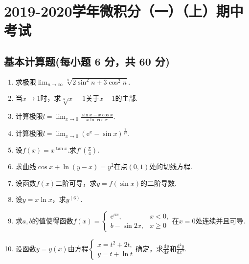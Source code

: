 \documentclass[../main.tex]{subfiles}
\begin{document}
\chapter{2019-2020学年微积分（一）（上）期中考试}

\section{基本计算题(每小题 6 分，共 60 分)}
\begin{enumerate}
    \item 求极限$\lim_{n\to \infty}\sqrt[n]{2\sin^{2} n+3\cos^{2} n}$.
          \vspace{10em}

    \item 当$x\to1$时，求$\sqrt[3]{x}-1$关于$x-1$的主部.
          \vspace{12em}

    \item 计算极限$l=\lim_{x\to0}\frac{\sin x-x\cos x}{x\ln\cos x}$.
          \vspace{12em}

    \item 计算极限$l=\lim_{x\to0}\left(\mathrm{e}^{x}-\sin x\right)^{\frac{1}{x^{2}}}$.
          \vspace{11em}

    \item 设$f(x)=x^{\tan x}$.求$f'\left(\frac{\pi}{4}\right)$.
          \vspace{9em}

    \item 求曲线$\cos x+\ln(y-x)=y^{2}$在点$(0,1)$处的切线方程.
          \vspace{10em}

    \item 设函数$f(x)$二阶可导，求$y=f(\sin x)$的二阶导数.
          \vspace{10em}

    \item 设$y=x\ln x$，求$y^{(6)}$.
          \vspace{10em}

    \item 求$a,b$的值使得函数$f(x)=
              \begin{cases}
                  \mathrm{e}^{ax}, & x<0,   \\
                  b-\sin 2x,       & x\geq0
              \end{cases}$在$x=0$处连续并且可导.
          \vspace{8em}

    \item 设函数$y=y(x)$由方程$\begin{cases}
                  x=t^{2}+2t, \\
                  y=t+\ln t
              \end{cases}$确定，求$\frac{\mathrm{d}y}{\mathrm{d}x}$和$\frac{\mathrm{d}^{2}
                  y}{\mathrm{d}x^{2}}$.
          \vspace{8em}
\end{enumerate}
\end{document}
